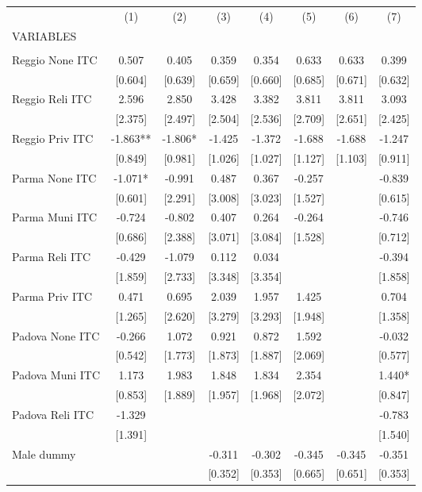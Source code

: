 \begin{tabular}{lccccccc} \hline
 & (1) & (2) & (3) & (4) & (5) & (6) & (7) \\
VARIABLES &  &  &  &  &  &  &  \\ \hline
 &  &  &  &  &  &  &  \\
Reggio None ITC & 0.507 & 0.405 & 0.359 & 0.354 & 0.633 & 0.633 & 0.399 \\
 & [0.604] & [0.639] & [0.659] & [0.660] & [0.685] & [0.671] & [0.632] \\
Reggio Reli ITC & 2.596 & 2.850 & 3.428 & 3.382 & 3.811 & 3.811 & 3.093 \\
 & [2.375] & [2.497] & [2.504] & [2.536] & [2.709] & [2.651] & [2.425] \\
Reggio Priv ITC & -1.863** & -1.806* & -1.425 & -1.372 & -1.688 & -1.688 & -1.247 \\
 & [0.849] & [0.981] & [1.026] & [1.027] & [1.127] & [1.103] & [0.911] \\
Parma None ITC & -1.071* & -0.991 & 0.487 & 0.367 & -0.257 &  & -0.839 \\
 & [0.601] & [2.291] & [3.008] & [3.023] & [1.527] &  & [0.615] \\
Parma Muni ITC & -0.724 & -0.802 & 0.407 & 0.264 & -0.264 &  & -0.746 \\
 & [0.686] & [2.388] & [3.071] & [3.084] & [1.528] &  & [0.712] \\
Parma Reli ITC & -0.429 & -1.079 & 0.112 & 0.034 &  &  & -0.394 \\
 & [1.859] & [2.733] & [3.348] & [3.354] &  &  & [1.858] \\
Parma Priv ITC & 0.471 & 0.695 & 2.039 & 1.957 & 1.425 &  & 0.704 \\
 & [1.265] & [2.620] & [3.279] & [3.293] & [1.948] &  & [1.358] \\
Padova None ITC & -0.266 & 1.072 & 0.921 & 0.872 & 1.592 &  & -0.032 \\
 & [0.542] & [1.773] & [1.873] & [1.887] & [2.069] &  & [0.577] \\
Padova Muni ITC & 1.173 & 1.983 & 1.848 & 1.834 & 2.354 &  & 1.440* \\
 & [0.853] & [1.889] & [1.957] & [1.968] & [2.072] &  & [0.847] \\
Padova Reli ITC & -1.329 &  &  &  &  &  & -0.783 \\
 & [1.391] &  &  &  &  &  & [1.540] \\
Male dummy &  &  & -0.311 & -0.302 & -0.345 & -0.345 & -0.351 \\
 &  &  & [0.352] & [0.353] & [0.665] & [0.651] & [0.353] \\

\end{tabular}
